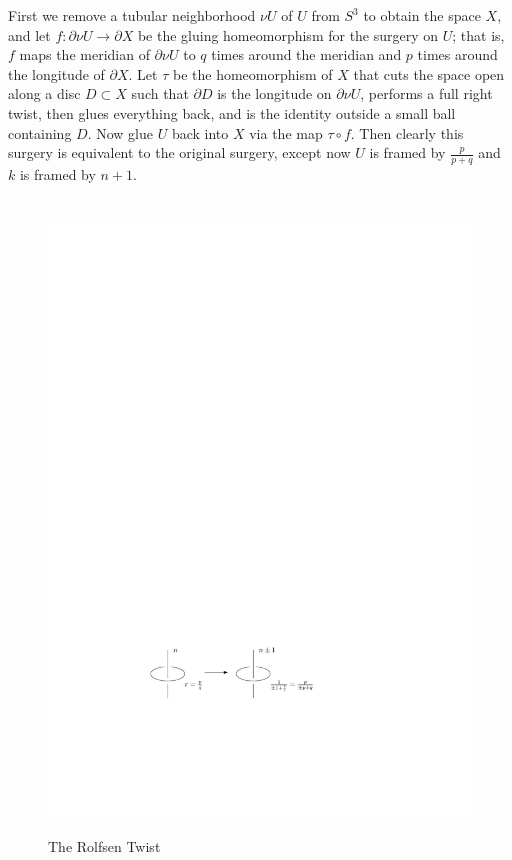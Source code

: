 First we remove a tubular neighborhood $\nu U$ of $U$ from $S^3$ to obtain the space $X$, and let $f : \partial \nu U \rightarrow \partial X$ be the gluing homeomorphism for the surgery on $U$; that is, $f$ maps the meridian of  $\partial \nu U$ to $q$ times around the meridian and $p$ times around the longitude of $\partial X$. Let $\tau$ be the homeomorphism of $X$ that cuts the space open along a disc $D \subset X$ such that $\partial D$ is the longitude on $\partial \nu U$, performs a full right twist, then glues everything back, and is the identity outside a small ball containing $D$. Now glue $U$ back into $X$ via the map $\tau \circ f$. Then clearly this surgery is equivalent to the original surgery, except now $U$ is framed by $\frac{p}{p+q}$ and $k$ is framed by $n+1$.

\begin{figure}[tb]
\centering
\ \ \ \ \ \ \ \ \ \ \ \ \ \ \ \ \includegraphics[scale=1]{graphics/rolfsen-twist}
\caption{The Rolfsen Twist}
\label{rolfsen-twist}
\end{figure}

